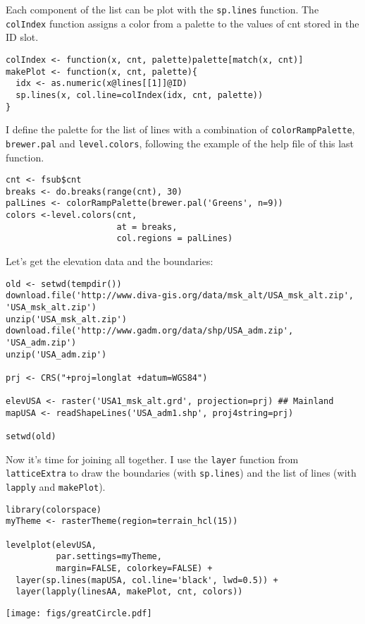 Each component of the list can be plot with the \texttt{sp.lines}
function.  The \texttt{colIndex} function assigns a color from a palette
to the values of cnt stored in the ID slot.


\lstset{language=r}
\begin{lstlisting}
colIndex <- function(x, cnt, palette)palette[match(x, cnt)]
makePlot <- function(x, cnt, palette){
  idx <- as.numeric(x@lines[[1]]@ID)
  sp.lines(x, col.line=colIndex(idx, cnt, palette))
}
\end{lstlisting}

I define the palette for the list of lines with a combination of
\texttt{colorRampPalette}, \texttt{brewer.pal} and \texttt{level.colors}, following the
example of the help file of this last function.


\lstset{language=R}
\begin{lstlisting}
cnt <- fsub$cnt
breaks <- do.breaks(range(cnt), 30)
palLines <- colorRampPalette(brewer.pal('Greens', n=9))
colors <-level.colors(cnt,
                      at = breaks,
                      col.regions = palLines)
\end{lstlisting}

Let's get the elevation data and the boundaries:


\lstset{language=R}
\begin{lstlisting}
old <- setwd(tempdir())
download.file('http://www.diva-gis.org/data/msk_alt/USA_msk_alt.zip', 'USA_msk_alt.zip')
unzip('USA_msk_alt.zip')
download.file('http://www.gadm.org/data/shp/USA_adm.zip', 'USA_adm.zip')
unzip('USA_adm.zip')

prj <- CRS("+proj=longlat +datum=WGS84")

elevUSA <- raster('USA1_msk_alt.grd', projection=prj) ## Mainland
mapUSA <- readShapeLines('USA_adm1.shp', proj4string=prj)

setwd(old)
\end{lstlisting}


Now it's time for joining all together. I use the \texttt{layer} function from \texttt{latticeExtra} to draw the boundaries (with \texttt{sp.lines}) and the list of lines (with \texttt{lapply} and \texttt{makePlot}).


\lstset{language=R}
\begin{lstlisting}
library(colorspace)
myTheme <- rasterTheme(region=terrain_hcl(15))

levelplot(elevUSA,
          par.settings=myTheme,
          margin=FALSE, colorkey=FALSE) +
  layer(sp.lines(mapUSA, col.line='black', lwd=0.5)) +
  layer(lapply(linesAA, makePlot, cnt, colors))
\end{lstlisting}

\texttt{[image: figs/greatCircle.pdf]}

